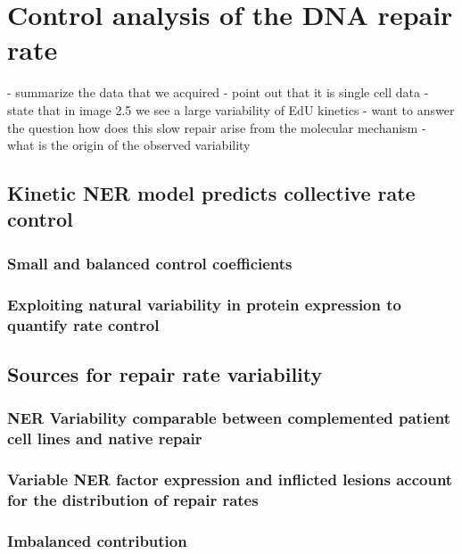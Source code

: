 \chapter{Control analysis of the DNA repair rate}
%
%

- summarize the data that we acquired
- point out that it is single cell data
- state that in image 2.5 we see a large variability of EdU kinetics 
- want to answer the question how does this slow repair arise from the molecular mechanism 
- what is the origin of the observed variability

\section{Kinetic NER model predicts collective rate control}

\subsection{Small and balanced control coefficients}

\subsection{Exploiting natural variability in protein expression to quantify rate control}


\section{Sources for repair rate variability}

\subsection{NER Variability comparable between complemented patient cell lines and native repair } 

\subsection{Variable NER factor expression and inflicted lesions account for the distribution of repair rates} 

\subsection{Imbalanced contribution }

